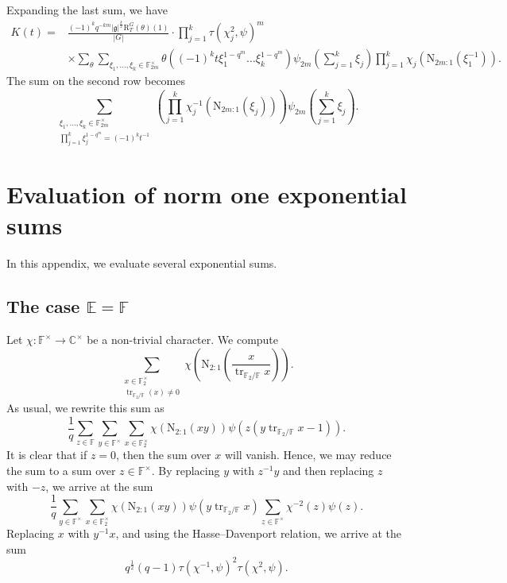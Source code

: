 \documentclass[12pt, reqno]{amsart}
\theoremstyle{definition}
\theoremstyle{definition}
\theoremstyle{definition}
\newcommand{\cComplex}{\mathbb{C}}
\newcommand{\multiplicativegroup}[1]{#1^{\times}}
\newcommand{\sizeof}[1]{\left|#1\right|}
\newcommand{\fieldCharacter}{\psi}
\newcommand{\trace}{\operatorname{tr}}
\newcommand{\FieldNorm}[2]{\mathrm{N}_{#1:#2}}
\newcommand{\finiteField}{\mathbb{F}}
\newcommand{\quadraticExtension}{\mathbb{E}}
\newcommand{\finiteFieldExtension}[1]{\finiteField_{#1}}
\newcommand{\lieAlgebra}{\mathfrak{g}}
\newcommand{\DeligneLusztigInduction}[2]{\mathrm{R}_{#1}^{#2}}
\begin{document}
Expanding the last sum, we have
\begin{align*}
	K\left(t\right) = & \frac{\left(-1\right)^k q^{-km}  \sizeof{\lieAlgebra}^{\frac{k}{2}} \DeligneLusztigInduction{T}{G}\left(\theta\right)\left(1\right)}{\sizeof{G}} \cdot \prod_{j=1}^k \tau\left(\chi_j^2, \fieldCharacter\right)^m \\
	 & \times \sum_{\theta} \sum_{\xi_1,\dots,\xi_k \in \multiplicativegroup{\finiteFieldExtension{2m}}} \theta\left( \left(-1\right)^k t \xi_1^{1-q^m} \dots \xi_k^{1-q^m} \right) \fieldCharacter_{2m}\left(\sum_{j=1}^k \xi_j\right) \prod_{j=1}^k \chi_j\left(\FieldNorm{2m}{1}\left(\xi_1^{-1} \right)\right).
\end{align*}
The sum on the second row becomes
$$\sum_{\substack{\xi_1,\dots,\xi_k \in \multiplicativegroup{\finiteFieldExtension{2m}}\\
\prod_{j=1}^k \xi_j^{1-q^m} = \left(-1\right)^k t^{-1}}} \left(\prod_{j=1}^k \chi_j^{-1}\left(\FieldNorm{2m}{1}\left(\xi_j \right)\right)\right) \fieldCharacter_{2m}\left(\sum_{j=1}^k \xi_j\right).$$

\appendix
\section{Evaluation of norm one exponential sums}

In this appendix, we evaluate several exponential sums.

\subsection{The case $\quadraticExtension = \finiteField$}
Let $\chi \colon \multiplicativegroup{\finiteField} \to \multiplicativegroup{\cComplex}$ be a non-trivial character. We compute $$\sum_{\substack{x \in \multiplicativegroup{\finiteFieldExtension{2}}\\
	\trace_{\finiteFieldExtension{2} \slash \finiteField}\left(x\right) \ne 0}} \chi\left(\FieldNorm{2}{1}\left(\frac{x}{\trace_{\finiteFieldExtension{2} \slash \finiteField} x}\right) \right).$$
As usual, we rewrite this sum as
$$\frac{1}{q} \sum_{z \in \finiteField} \sum_{y \in \multiplicativegroup{\finiteField}} \sum_{x \in \multiplicativegroup{\finiteFieldExtension{2}}} \chi\left(\FieldNorm{2}{1}\left(xy\right)\right) \fieldCharacter\left(z\left(y \trace_{\finiteFieldExtension{2} \slash \finiteField} x - 1\right)\right).$$
It is clear that if $z = 0$, then the sum over $x$ will vanish. Hence, we may reduce the sum to a sum over $z \in \multiplicativegroup{\finiteField}$. By replacing $y$ with $z^{-1} y$ and then replacing $z$ with $-z$, we arrive at the sum
$$\frac{1}{q} \sum_{y \in \multiplicativegroup{\finiteField}} \sum_{x \in \multiplicativegroup{\finiteFieldExtension{2}}} \chi\left(\FieldNorm{2}{1}\left(xy\right)\right) \fieldCharacter\left(y \trace_{\finiteFieldExtension{2} \slash \finiteField} x\right) \sum_{z \in \multiplicativegroup{\finiteField}} \chi^{-2}\left(z\right)\fieldCharacter\left(z\right).$$
Replacing $x$ with $y^{-1}x$, and using the Hasse--Davenport relation, we arrive at the sum
$$q^{\frac{1}{2}} \left(q-1\right) \tau\left(\chi^{-1}, \fieldCharacter\right)^2 \tau\left(\chi^{2}, \fieldCharacter\right).$$
\end{document}
